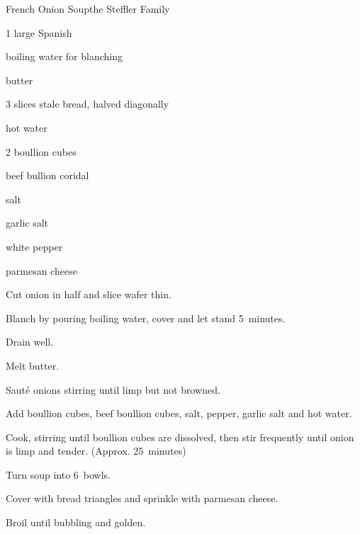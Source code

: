 \begin{recipe}{French Onion Soup}{the Steffler Family}{}

\begin{ingredients}
\item 1 large Spanish 
\item boiling water for blanching
\item \C{\quarter} butter
\item 3 slices stale bread, halved diagonally
\item {} hot water
\item 2 boullion cubes
\item \C{\quarter} beef bullion coridal
\item {} salt
\item \tp{\eighth} garlic salt
\item \tp{\eighth} white pepper
\item \C{\half} parmesan cheese
\end{ingredients}

\begin{directions}
\item Cut onion in half and slice wafer thin.
\item Blanch by pouring boiling water, cover and let stand 5~minutes.
\item Drain well.
\item Melt butter.
\item Saut\'e onions stirring until limp but not browned.
\item Add boullion cubes, beef boullion cubes, salt, pepper, garlic salt and hot water.
\item Cook, stirring until boullion cubes are dissolved, then stir frequently until onion is limp and tender. (Approx. 25~minutes)
\item Turn soup into 6~bowls.
\item Cover with bread triangles and sprinkle with parmesan cheese.
\item Broil until bubbling and golden.
\end{directions}
\end{recipe}
